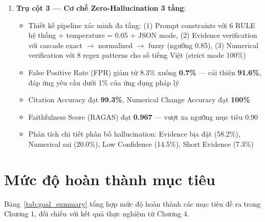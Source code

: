 \begin{enumerate}[label=\textbf{(\arabic*)}]
    \item \textbf{Trụ cột 3 — Cơ chế Zero-Hallucination 3 tầng}:
    \begin{itemize}
        \item Thiết kế pipeline xác minh đa tầng: (1) Prompt constraints với 6 RULE hệ thống + temperature = 0.05 + JSON mode, (2) Evidence verification với cascade exact $\rightarrow$ normalized $\rightarrow$ fuzzy (ngưỡng 0.85), (3) Numerical verification với 8 regex patterns cho số tiếng Việt (strict mode 100\%)
        \item False Positive Rate (FPR) giảm từ 8.3\% xuống \textbf{0.7\%} — cải thiện \textbf{91.6\%}, đáp ứng yêu cầu dưới 1\% của ứng dụng pháp lý
        \item Citation Accuracy đạt \textbf{99.3\%}, Numerical Change Accuracy đạt \textbf{100\%}
        \item Faithfulness Score (RAGAS) đạt \textbf{0.967} — vượt xa ngưỡng mục tiêu 0.90
        \item Phân tích chi tiết phân bố hallucination: Evidence bịa đặt (58.2\%), Numerical sai (20.0\%), Low Confidence (14.5\%), Short Evidence (7.3\%)
    \end{itemize}

\end{enumerate}

\section{Mức độ hoàn thành mục tiêu}

Bảng~\ref{tab:goal_summary} tổng hợp mức độ hoàn thành các mục tiêu đề ra trong Chương 1, đối chiếu với kết quả thực nghiệm từ Chương 4.

